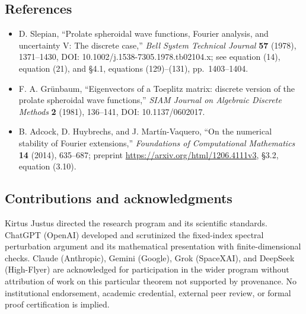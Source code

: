 \documentclass[
  10pt,
  a4paper,
]{article}
\providecommand{\tightlist}{%
  \setlength{\itemsep}{0pt}\setlength{\parskip}{0pt}}
\begin{document}
\subsection{References}\label{references}

\begin{itemize}
\tightlist
\item
  D. Slepian, ``Prolate spheroidal wave functions, Fourier analysis, and uncertainty V: The discrete case,'' \emph{Bell System Technical Journal} \textbf{57} (1978), 1371--1430, DOI: 10.1002/j.1538-7305.1978.tb02104.x; see equation (14), equation (21), and §4.1, equations (129)--(131), pp.~1403--1404.
\item
  F. A. Grünbaum, ``Eigenvectors of a Toeplitz matrix: discrete version of the prolate spheroidal wave functions,'' \emph{SIAM Journal on Algebraic Discrete Methods} \textbf{2} (1981), 136--141, DOI: 10.1137/0602017.
\item
  B. Adcock, D. Huybrechs, and J. Martín-Vaquero, ``On the numerical stability of Fourier extensions,'' \emph{Foundations of Computational Mathematics} \textbf{14} (2014), 635--687; preprint \url{https://arxiv.org/html/1206.4111v3}, §3.2, equation (3.10).
\end{itemize}

\subsection{Contributions and acknowledgments}\label{contributions-and-acknowledgments}

Kirtus Justus directed the research program and its scientific standards. ChatGPT (OpenAI) developed and scrutinized the fixed-index spectral perturbation argument and its mathematical presentation with finite-dimensional checks. Claude (Anthropic), Gemini (Google), Grok (SpaceXAI), and DeepSeek (High-Flyer) are acknowledged for participation in the wider program without attribution of work on this particular theorem not supported by provenance. No institutional endorsement, academic credential, external peer review, or formal proof certification is implied.
\end{document}
